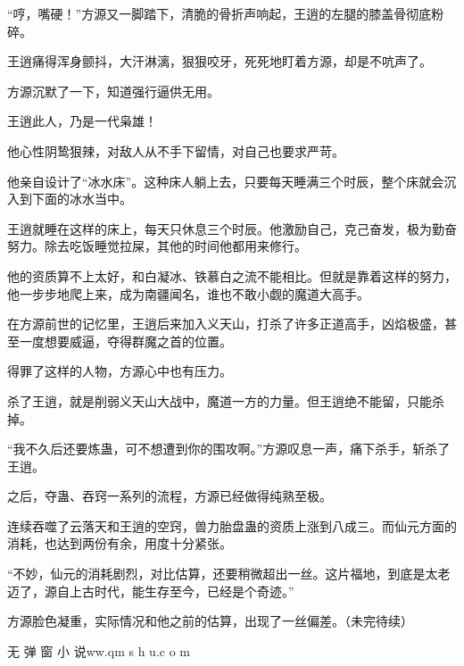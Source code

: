 \begin{this_body}
“哼，嘴硬！”方源又一脚踏下，清脆的骨折声响起，王逍的左腿的膝盖骨彻底粉碎。

王逍痛得浑身颤抖，大汗淋漓，狠狠咬牙，死死地盯着方源，却是不吭声了。

方源沉默了一下，知道强行逼供无用。

王逍此人，乃是一代枭雄！

他心性阴鸷狠辣，对敌人从不手下留情，对自己也要求严苛。

他亲自设计了“冰水床”。这种床人躺上去，只要每天睡满三个时辰，整个床就会沉入到下面的冰水当中。

王逍就睡在这样的床上，每天只休息三个时辰。他激励自己，克己奋发，极为勤奋努力。除去吃饭睡觉拉屎，其他的时间他都用来修行。

他的资质算不上太好，和白凝冰、铁慕白之流不能相比。但就是靠着这样的努力，他一步步地爬上来，成为南疆闻名，谁也不敢小觑的魔道大高手。

在方源前世的记忆里，王逍后来加入义天山，打杀了许多正道高手，凶焰极盛，甚至一度想要威逼，夺得群魔之首的位置。

得罪了这样的人物，方源心中也有压力。

杀了王逍，就是削弱义天山大战中，魔道一方的力量。但王逍绝不能留，只能杀掉。

“我不久后还要炼蛊，可不想遭到你的围攻啊。”方源叹息一声，痛下杀手，斩杀了王逍。

之后，夺蛊、吞窍一系列的流程，方源已经做得纯熟至极。

连续吞噬了云落天和王逍的空窍，兽力胎盘蛊的资质上涨到八成三。而仙元方面的消耗，也达到两份有余，用度十分紧张。

“不妙，仙元的消耗剧烈，对比估算，还要稍微超出一丝。这片福地，到底是太老迈了，源自上古时代，能生存至今，已经是个奇迹。”

方源脸色凝重，实际情况和他之前的估算，出现了一丝偏差。（未完待续）

无 弹 窗 小 说ww.qm s h u.c o m

\end{this_body}

